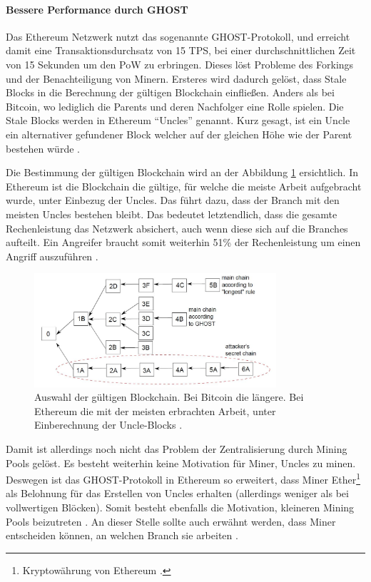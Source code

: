 \paragraph{Bessere Performance durch GHOST}
Das Ethereum Netzwerk nutzt das sogenannte GHOST-Protokoll, und erreicht damit eine Transaktionsdurchsatz von 15 TPS, bei einer durchschnittlichen Zeit von 15 Sekunden um den \acs{PoW} zu erbringen. Dieses löst Probleme des Forkings und der Benachteiligung von Minern. Ersteres wird dadurch gelöst, dass Stale Blocks in die Berechnung der gültigen Blockchain einfließen. Anders als bei Bitcoin, wo lediglich die Parents und deren Nachfolger eine Rolle spielen. Die Stale Blocks werden in Ethereum ``Uncles'' genannt. Kurz gesagt, ist ein Uncle ein alternativer gefundener Block welcher auf der gleichen Höhe wie der Parent bestehen würde \cite{EthereumTeamEthereumWhitePaper2017}.

Die Bestimmung der gültigen Blockchain wird an der Abbildung \ref{fig:forking-risks} ersichtlich. In Ethereum ist die Blockchain die gültige, für welche die meiste Arbeit aufgebracht wurde, unter Einbezug der Uncles. Das führt dazu, dass der Branch mit den meisten Uncles bestehen bleibt. Das bedeutet letztendlich, dass die gesamte Rechenleistung das Netzwerk absichert, auch wenn diese sich auf die Branches aufteilt. Ein Angreifer braucht somit weiterhin 51\% der Rechenleistung um einen Angriff auszuführen \cite{SompolinskyAcceleratingBitcoinTransaction2013}.

\begin{figure}[!htbp]
  \centering
    \includegraphics[width=0.8\textwidth,angle=0]{images/forking-risks}
     \caption{Auswahl der gültigen Blockchain. Bei Bitcoin die längere. Bei Ethereum die mit der meisten erbrachten Arbeit, unter Einberechnung der Uncle-Blocks \cite{SompolinskyAcceleratingBitcoinTransaction2013}.}
    \label{fig:forking-risks}
\end{figure} 

Damit ist allerdings noch nicht das Problem der Zentralisierung durch Mining Pools gelöst. Es besteht weiterhin keine Motivation für Miner, Uncles zu minen. Deswegen ist das GHOST-Protokoll in Ethereum so erweitert, dass Miner Ether\footnote{Kryptowährung von Ethereum \cite{EthereumTeamEthereumWhitePaper2017}.} als Belohnung für das Erstellen von Uncles erhalten (allerdings weniger als bei vollwertigen Blöcken). Somit besteht ebenfalls die Motivation, kleineren Mining Pools beizutreten \cite{EthereumTeamEthereumWhitePaper2017}. An dieser Stelle sollte auch erwähnt werden, dass Miner entscheiden können, an welchen Branch sie arbeiten \cite{ZhengBlockchainChallengesOpportunities2017}.

